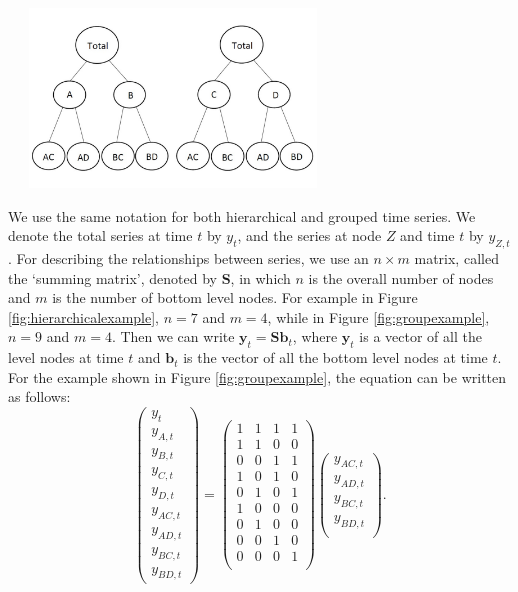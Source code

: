 \documentclass[11pt,a4paper,]{article}
\let\origfigure\figure
\let\endorigfigure\endfigure
\renewenvironment{figure}[1][2] {
    \expandafter\origfigure\expandafter[htbp]
} {
    \endorigfigure
}
\begin{document}
\begin{figure}

{\centering \includegraphics[width=330px,height=180px]{hcf_files/figure-latex/groupexample-1} 

}

\caption{An example of two level grouped structure}\label{fig:groupexample}
\end{figure}

We use the same notation \autocite[following][]{fpp2} for both hierarchical and grouped time series. We denote the total series at time \(t\) by \(y_t\), and the series at node \(Z\) and time \(t\) by \(y_{Z,t}\). For describing the relationships between series, we use an \(n\times m\) matrix, called the `summing matrix', denoted by \(\bm{S}\), in which \(n\) is the overall number of nodes and \(m\) is the number of bottom level nodes. For example in Figure \ref{fig:hierarchicalexample}, \(n = 7\) and \(m = 4\), while in Figure \ref{fig:groupexample}, \(n=9\) and \(m=4\). Then we can write \(\bm{y}_t=\bm{S}\bm{b}_t\), where \(\bm{y}_t\) is a vector of all the level nodes at time \(t\) and \(\bm{b}_t\) is the vector of all the bottom level nodes at time \(t\). For the example shown in Figure \ref{fig:groupexample}, the equation can be written as follows:
\begin{equation}\label{eq:Smatrixexample}
\begin{pmatrix}
  y_{t}\\y_{A,t}\\y_{B,t}\\y_{C,t}\\y_{D,t}\\y_{AC,t}\\y_{AD,t}\\y_{BC,t}\\y_{BD,t}
\end{pmatrix} =
\begin{pmatrix}
  1&1&1&1\\1&1&0&0\\0&0&1&1\\1&0&1&0\\0&1&0&1\\1&0&0&0\\0&1&0&0\\0&0&1&0\\0&0&0&1\\
\end{pmatrix}
\begin{pmatrix}
  y_{AC,t}\\y_{AD,t}\\y_{BC,t}\\y_{BD,t}\\
\end{pmatrix}.
\end{equation}
\end{document}

